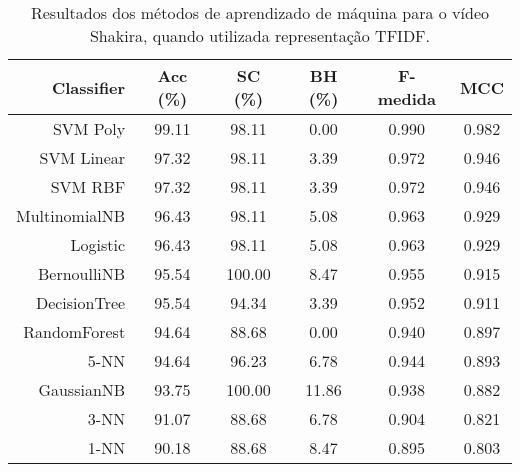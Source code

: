 \begin{table}[!htb]
\centering
\caption{Resultados dos métodos de aprendizado de máquina para o vídeo Shakira, quando utilizada representação TFIDF.}
\label{tab:Shakira-tfidf}
\begin{tabular}{r|c|c|c|c|c}
\hline\hline
Classifier & Acc (\%) & SC (\%) & BH (\%) & F-medida & MCC \\ \hline
SVM Poly & 99.11 & 98.11 & 0.00 & 0.990 & 0.982 & \\
SVM Linear & 97.32 & 98.11 & 3.39 & 0.972 & 0.946 & \\
SVM RBF & 97.32 & 98.11 & 3.39 & 0.972 & 0.946 & \\
MultinomialNB & 96.43 & 98.11 & 5.08 & 0.963 & 0.929 & \\
Logistic & 96.43 & 98.11 & 5.08 & 0.963 & 0.929 & \\
BernoulliNB & 95.54 & 100.00 & 8.47 & 0.955 & 0.915 & \\
DecisionTree & 95.54 & 94.34 & 3.39 & 0.952 & 0.911 & \\
RandomForest & 94.64 & 88.68 & 0.00 & 0.940 & 0.897 & \\
5-NN & 94.64 & 96.23 & 6.78 & 0.944 & 0.893 & \\
GaussianNB & 93.75 & 100.00 & 11.86 & 0.938 & 0.882 & \\
3-NN & 91.07 & 88.68 & 6.78 & 0.904 & 0.821 & \\
1-NN & 90.18 & 88.68 & 8.47 & 0.895 & 0.803 & \\
\hline\hline
\end{tabular}
\end{table}

